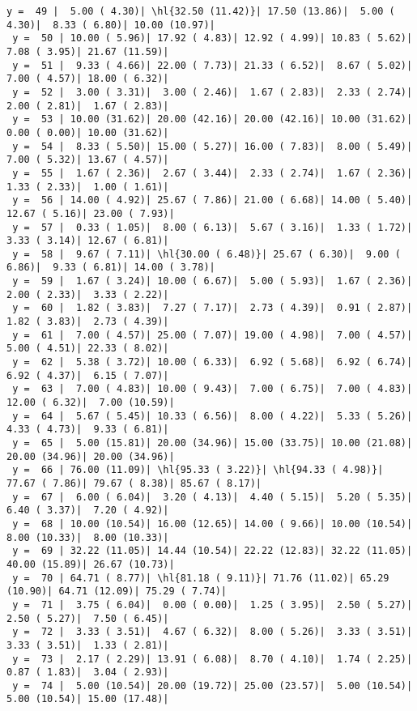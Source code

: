 \documentclass[10pt]{article}
\newcommand{\hl}[1]{\textcolor{blue}{#1}}
\begin{document}
\begin{Verbatim}[fontsize=\small, commandchars=\\\{\}]
 y =  49 |  5.00 ( 4.30)| \hl{32.50 (11.42)}| 17.50 (13.86)|  5.00 ( 4.30)|  8.33 ( 6.80)| 10.00 (10.97)|
 y =  50 | 10.00 ( 5.96)| 17.92 ( 4.83)| 12.92 ( 4.99)| 10.83 ( 5.62)|  7.08 ( 3.95)| 21.67 (11.59)|
 y =  51 |  9.33 ( 4.66)| 22.00 ( 7.73)| 21.33 ( 6.52)|  8.67 ( 5.02)|  7.00 ( 4.57)| 18.00 ( 6.32)|
 y =  52 |  3.00 ( 3.31)|  3.00 ( 2.46)|  1.67 ( 2.83)|  2.33 ( 2.74)|  2.00 ( 2.81)|  1.67 ( 2.83)|
 y =  53 | 10.00 (31.62)| 20.00 (42.16)| 20.00 (42.16)| 10.00 (31.62)|  0.00 ( 0.00)| 10.00 (31.62)|
 y =  54 |  8.33 ( 5.50)| 15.00 ( 5.27)| 16.00 ( 7.83)|  8.00 ( 5.49)|  7.00 ( 5.32)| 13.67 ( 4.57)|
 y =  55 |  1.67 ( 2.36)|  2.67 ( 3.44)|  2.33 ( 2.74)|  1.67 ( 2.36)|  1.33 ( 2.33)|  1.00 ( 1.61)|
 y =  56 | 14.00 ( 4.92)| 25.67 ( 7.86)| 21.00 ( 6.68)| 14.00 ( 5.40)| 12.67 ( 5.16)| 23.00 ( 7.93)|
 y =  57 |  0.33 ( 1.05)|  8.00 ( 6.13)|  5.67 ( 3.16)|  1.33 ( 1.72)|  3.33 ( 3.14)| 12.67 ( 6.81)|
 y =  58 |  9.67 ( 7.11)| \hl{30.00 ( 6.48)}| 25.67 ( 6.30)|  9.00 ( 6.86)|  9.33 ( 6.81)| 14.00 ( 3.78)|
 y =  59 |  1.67 ( 3.24)| 10.00 ( 6.67)|  5.00 ( 5.93)|  1.67 ( 2.36)|  2.00 ( 2.33)|  3.33 ( 2.22)|
 y =  60 |  1.82 ( 3.83)|  7.27 ( 7.17)|  2.73 ( 4.39)|  0.91 ( 2.87)|  1.82 ( 3.83)|  2.73 ( 4.39)|
 y =  61 |  7.00 ( 4.57)| 25.00 ( 7.07)| 19.00 ( 4.98)|  7.00 ( 4.57)|  5.00 ( 4.51)| 22.33 ( 8.02)|
 y =  62 |  5.38 ( 3.72)| 10.00 ( 6.33)|  6.92 ( 5.68)|  6.92 ( 6.74)|  6.92 ( 4.37)|  6.15 ( 7.07)|
 y =  63 |  7.00 ( 4.83)| 10.00 ( 9.43)|  7.00 ( 6.75)|  7.00 ( 4.83)| 12.00 ( 6.32)|  7.00 (10.59)|
 y =  64 |  5.67 ( 5.45)| 10.33 ( 6.56)|  8.00 ( 4.22)|  5.33 ( 5.26)|  4.33 ( 4.73)|  9.33 ( 6.81)|
 y =  65 |  5.00 (15.81)| 20.00 (34.96)| 15.00 (33.75)| 10.00 (21.08)| 20.00 (34.96)| 20.00 (34.96)|
 y =  66 | 76.00 (11.09)| \hl{95.33 ( 3.22)}| \hl{94.33 ( 4.98)}| 77.67 ( 7.86)| 79.67 ( 8.38)| 85.67 ( 8.17)|
 y =  67 |  6.00 ( 6.04)|  3.20 ( 4.13)|  4.40 ( 5.15)|  5.20 ( 5.35)|  6.40 ( 3.37)|  7.20 ( 4.92)|
 y =  68 | 10.00 (10.54)| 16.00 (12.65)| 14.00 ( 9.66)| 10.00 (10.54)|  8.00 (10.33)|  8.00 (10.33)|
 y =  69 | 32.22 (11.05)| 14.44 (10.54)| 22.22 (12.83)| 32.22 (11.05)| 40.00 (15.89)| 26.67 (10.73)|
 y =  70 | 64.71 ( 8.77)| \hl{81.18 ( 9.11)}| 71.76 (11.02)| 65.29 (10.90)| 64.71 (12.09)| 75.29 ( 7.74)|
 y =  71 |  3.75 ( 6.04)|  0.00 ( 0.00)|  1.25 ( 3.95)|  2.50 ( 5.27)|  2.50 ( 5.27)|  7.50 ( 6.45)|
 y =  72 |  3.33 ( 3.51)|  4.67 ( 6.32)|  8.00 ( 5.26)|  3.33 ( 3.51)|  3.33 ( 3.51)|  1.33 ( 2.81)|
 y =  73 |  2.17 ( 2.29)| 13.91 ( 6.08)|  8.70 ( 4.10)|  1.74 ( 2.25)|  0.87 ( 1.83)|  3.04 ( 2.93)|
 y =  74 |  5.00 (10.54)| 20.00 (19.72)| 25.00 (23.57)|  5.00 (10.54)|  5.00 (10.54)| 15.00 (17.48)|

\end{Verbatim}
\end{document}
